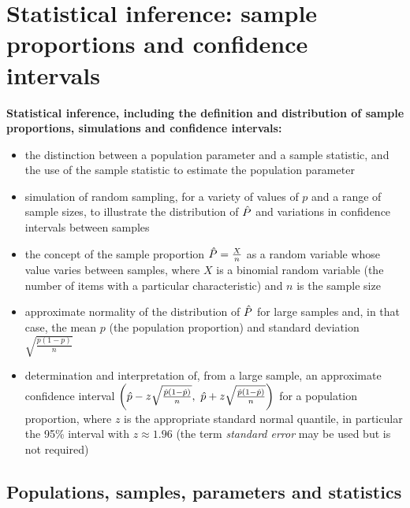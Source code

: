 \section{Statistical inference: sample proportions and confidence intervals}
\label{sec:inference}

\begin{sdbox}
\textbf{Statistical inference, including the definition and distribution of sample proportions, simulations and confidence intervals:}
\begin{itemize}
  \item the distinction between a population parameter and a sample statistic, and the use of the sample statistic to estimate the population parameter
  \item simulation of random sampling, for a variety of values of $p$ and a range of sample sizes, to illustrate the distribution of $\hat{P}$ and variations in confidence intervals between samples
  \item the concept of the sample proportion $\hat{P}=\frac{X}{n}$ as a random variable whose value varies between samples, where $X$ is a binomial random variable (the number of items with a particular characteristic) and $n$ is the sample size
  \item approximate normality of the distribution of $\hat{P}$ for large samples and, in that case, the mean $p$ (the population proportion) and standard deviation $\sqrt{\frac{p(1-p)}{n}}$
  \item determination and interpretation of, from a large sample, an approximate confidence interval $\left(\phat-z\sqrt{\frac{\phat(1-\phat)}{n}},\ \phat+z\sqrt{\frac{\phat(1-\phat)}{n}}\right)$ for a population proportion, where $z$ is the appropriate standard normal quantile, in particular the 95\% interval with $z\approx1.96$ (the term \emph{standard error} may be used but is not required)
\end{itemize}
\end{sdbox}

\subsection{Populations, samples, parameters and statistics}
\label{sec:popsamp}

